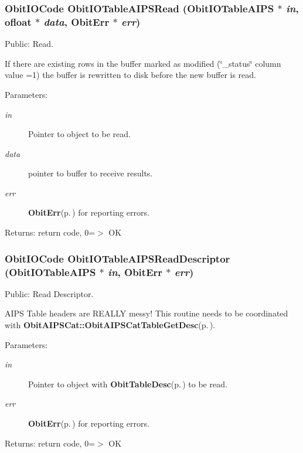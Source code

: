 \subsubsection{\setlength{\rightskip}{0pt plus 5cm}Obit\-IOCode Obit\-IOTable\-AIPSRead ({\bf Obit\-IOTable\-AIPS} $\ast$ {\em in}, {\bf ofloat} $\ast$ {\em data}, {\bf Obit\-Err} $\ast$ {\em err})}\label{ObitIOTableAIPS_8h_a12}


Public: Read. 

If there are existing rows in the buffer marked as modified (\char`\"{}\_\-status\char`\"{} column value =1) the buffer is rewritten to disk before the new buffer is read. \begin{Desc}
\item[Parameters:]
\begin{description}
\item[{\em in}]Pointer to object to be read. \item[{\em data}]pointer to buffer to receive results. \item[{\em err}]{\bf Obit\-Err}{\rm (p.\,\pageref{structObitErr})} for reporting errors. \end{description}
\end{Desc}
\begin{Desc}
\item[Returns:]return code, 0=$>$ OK \end{Desc}
\subsubsection{\setlength{\rightskip}{0pt plus 5cm}Obit\-IOCode Obit\-IOTable\-AIPSRead\-Descriptor ({\bf Obit\-IOTable\-AIPS} $\ast$ {\em in}, {\bf Obit\-Err} $\ast$ {\em err})}\label{ObitIOTableAIPS_8h_a17}


Public: Read Descriptor. 

AIPS Table headers are REALLY messy! This routine needs to be coordinated with {\bf Obit\-AIPSCat::Obit\-AIPSCat\-Table\-Get\-Desc}{\rm (p.\,\pageref{ObitAIPSCat_8c_a11})}. \begin{Desc}
\item[Parameters:]
\begin{description}
\item[{\em in}]Pointer to object with {\bf Obit\-Table\-Desc}{\rm (p.\,\pageref{structObitTableDesc})} to be read. \item[{\em err}]{\bf Obit\-Err}{\rm (p.\,\pageref{structObitErr})} for reporting errors. \end{description}
\end{Desc}
\begin{Desc}
\item[Returns:]return code, 0=$>$ OK \end{Desc}
